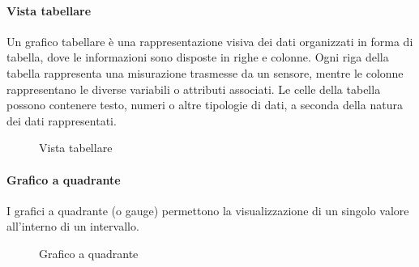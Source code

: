 \paragraph{Vista tabellare}
\hypertarget{par:tabella}{}
Un grafico tabellare è una rappresentazione visiva dei dati organizzati in forma di tabella, dove le informazioni sono disposte in righe e colonne. Ogni riga della tabella rappresenta una misurazione trasmesse da un sensore, mentre le colonne rappresentano le diverse variabili o attributi associati. Le celle della tabella possono contenere testo, numeri o altre tipologie di dati, a seconda della natura dei dati rappresentati.
\begin{figure}[H]
    \centering
    \caption{Vista tabellare}
    \label{fig:my_label}
\end{figure}

\paragraph{Grafico a quadrante}
\hypertarget{par:grafico_quadrante}{}
I grafici a quadrante (o gauge) permettono la visualizzazione di un singolo valore all’interno di un intervallo.
\begin{figure}[H]
    \centering
    \caption{Grafico a quadrante}
    \label{fig:my_label}
\end{figure}


